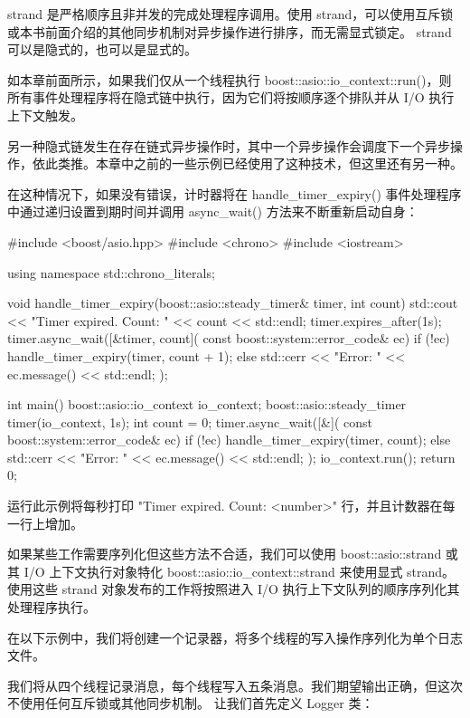 strand 是严格顺序且非并发的完成处理程序调用。使用 strand，可以使用互斥锁或本书前面介绍的其他同步机制对异步操作进行排序，而无需显式锁定。 strand 可以是隐式的，也可以是显式的。

如本章前面所示，如果我们仅从一个线程执行 boost::asio::io\_context::run()，则所有事件处理程序将在隐式链中执行，因为它们将按顺序逐个排队并从 I/O 执行上下文触发。

另一种隐式链发生在存在链式异步操作时，其中一个异步操作会调度下一个异步操作，依此类推。本章中之前的一些示例已经使用了这种技术，但这里还有另一种。

在这种情况下，如果没有错误，计时器将在 handle\_timer\_expiry() 事件处理程序中通过递归设置到期时间并调用 async\_wait() 方法来不断重新启动自身：

\begin{cpp}
#include <boost/asio.hpp>
#include <chrono>
#include <iostream>

using namespace std::chrono_literals;

void handle_timer_expiry(boost::asio::steady_timer& timer,
                         int count) {
    std::cout << "Timer expired. Count: " << count
    << std::endl;
    timer.expires_after(1s);
    timer.async_wait([&timer, count](
                const boost::system::error_code& ec) {
        if (!ec) {
            handle_timer_expiry(timer, count + 1);
        } else {
            std::cerr << "Error: " << ec.message()
                      << std::endl;
        }
    });
}

int main() {
    boost::asio::io_context io_context;
    boost::asio::steady_timer timer(io_context, 1s);
    int count = 0;
    timer.async_wait([&](
                const boost::system::error_code& ec) {
        if (!ec) {
            handle_timer_expiry(timer, count);
        } else {
            std::cerr << "Error: " << ec.message()
                      << std::endl;
        }
    });
    io_context.run();
    return 0;
}
\end{cpp}

运行此示例将每秒打印 "Timer expired. Count: <number>" 行，并且计数器在每一行上增加。

如果某些工作需要序列化但这些方法不合适，我们可以使用 boost::asio::strand 或其 I/O 上下文执行对象特化 boost::asio::io\_context::strand 来使用显式 strand。使用这些 strand 对象发布的工作将按照进入 I/O 执行上下文队列的顺序序列化其处理程序执行。

在以下示例中，我们将创建一个记录器，将多个线程的写入操作序列化为单个日志文件。

我们将从四个线程记录消息，每个线程写入五条消息。我们期望输出正确，但这次不使用任何互斥锁或其他同步机制。
让我们首先定义 Logger 类：

